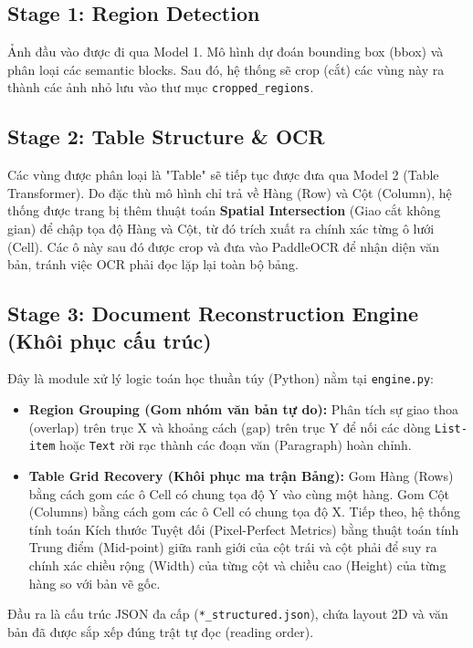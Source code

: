 \documentclass[12pt,a4paper]{article}
\begin{document}
\subsection{Stage 1: Region Detection}
Ảnh đầu vào được đi qua Model 1. Mô hình dự đoán bounding box (bbox) và phân loại các semantic blocks. Sau đó, hệ thống sẽ crop (cắt) các vùng này ra thành các ảnh nhỏ lưu vào thư mục \texttt{cropped\_regions}.

\subsection{Stage 2: Table Structure \& OCR}
Các vùng được phân loại là "Table" sẽ tiếp tục được đưa qua Model 2 (Table Transformer). Do đặc thù mô hình chỉ trả về Hàng (Row) và Cột (Column), hệ thống được trang bị thêm thuật toán \textbf{Spatial Intersection} (Giao cắt không gian) để chập tọa độ Hàng và Cột, từ đó trích xuất ra chính xác từng ô lưới (Cell). Các ô này sau đó được crop và đưa vào PaddleOCR để nhận diện văn bản, tránh việc OCR phải đọc lặp lại toàn bộ bảng.

\subsection{Stage 3: Document Reconstruction Engine (Khôi phục cấu trúc)}
Đây là module xử lý logic toán học thuần túy (Python) nằm tại \texttt{engine.py}:
\begin{itemize}
    \item \textbf{Region Grouping (Gom nhóm văn bản tự do):} Phân tích sự giao thoa (overlap) trên trục X và khoảng cách (gap) trên trục Y để nối các dòng \texttt{List-item} hoặc \texttt{Text} rời rạc thành các đoạn văn (Paragraph) hoàn chỉnh.
    \item \textbf{Table Grid Recovery (Khôi phục ma trận Bảng):} Gom Hàng (Rows) bằng cách gom các ô Cell có chung tọa độ Y vào cùng một hàng. Gom Cột (Columns) bằng cách gom các ô Cell có chung tọa độ X. Tiếp theo, hệ thống tính toán Kích thước Tuyệt đối (Pixel-Perfect Metrics) bằng thuật toán tính Trung điểm (Mid-point) giữa ranh giới của cột trái và cột phải để suy ra chính xác chiều rộng (Width) của từng cột và chiều cao (Height) của từng hàng so với bản vẽ gốc.
\end{itemize}
Đầu ra là cấu trúc JSON đa cấp (\texttt{*\_structured.json}), chứa layout 2D và văn bản đã được sắp xếp đúng trật tự đọc (reading order).
\end{document}
